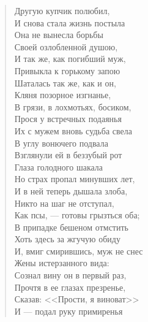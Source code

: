 \begin{verse}
\begin{patverse*}
Другую купчик полюбил,\\
И снова стала жизнь постыла\ldotst\\
Она не вынесла борьбы\\
Своей озлобленной душою,\\
И так же, как погибший муж,\\
Привыкла к горькому запою\ldotst\\
Шаталась так же, как и он,\\
Кляня позорное изгнанье,\\
В грязи, в лохмотьях, босиком,\\
Прося у встречных подаянья\ldotst\\
Их с мужем вновь судьба свела\\
В углу вонючего подвала\ldotse\\
Взглянули ей в беззубый рот\\
Глаза голодного шакала\ldotst\\
Но страх пропал минувших лет,\\
И в ней теперь дышала злоба,\\
Никто на шаг не отступал,\\
Как псы, --- готовы грызться оба;\\
В припадке бешеном отмстить\\
Хоть здесь за жгучую обиду\ldotst\\
И, вмиг смирившись, муж не снес\\
Жены истерзанного вида:\\
Сознал вину он в первый раз,\\
Прочтя в ее глазах презренье,\\
Сказав: <<Прости, я виноват>>\ldotst\\
И --- подал руку примиренья\ldotst
\end{patverse*}
\end{verse}

\newpage
\vspace*{0cm}


